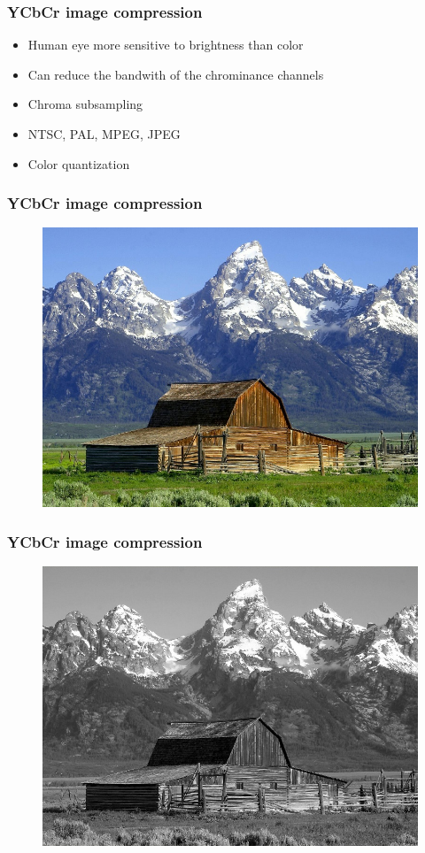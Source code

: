 \documentclass{beamer}
\begin{document}
\begin{frame}
\frametitle{YCbCr image compression}
    \begin{itemize}
    \item Human eye more sensitive to brightness than color
    \item Can reduce the bandwith of the chrominance channels
    \item Chroma subsampling
    \item NTSC, PAL, MPEG, JPEG
    \item Color quantization
    \end{itemize}
\end{frame}

\begin{frame}
\frametitle{YCbCr image compression}
    \begin{figure}[htb]
    \includegraphics[scale=0.3]{YCbCr-normal.jpg}
    \end{figure}
\end{frame}

\begin{frame}
\frametitle{YCbCr image compression}
    \begin{figure}[htb]
    \includegraphics[scale=0.3]{YCbCr-bw.jpg}
    \end{figure}
\end{frame}
\end{document}
